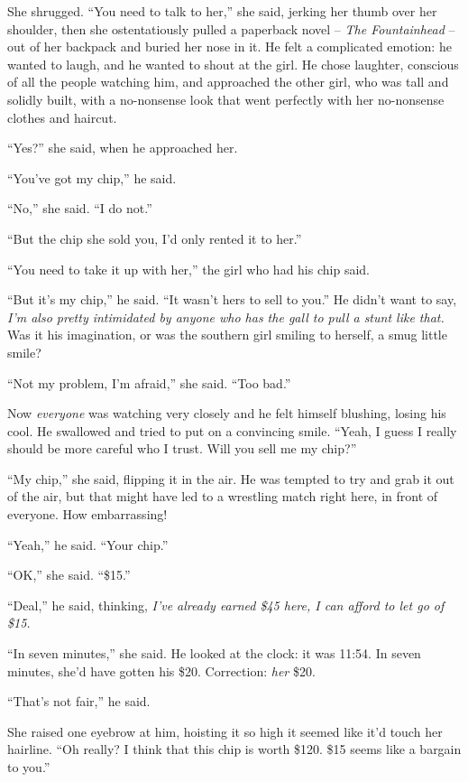 She shrugged. ``You need to talk to her,'' she said, jerking her
thumb over her shoulder, then she ostentatiously pulled a paperback
novel -- \emph{The Fountainhead} -- out of her backpack and buried
her nose in it. He felt a complicated emotion: he wanted to laugh,
and he wanted to shout at the girl. He chose laughter, conscious of
all the people watching him, and approached the other girl, who was
tall and solidly built, with a no-nonsense look that went perfectly
with her no-nonsense clothes and haircut.

``Yes?'' she said, when he approached her.

``You've got my chip,'' he said.

``No,'' she said. ``I do not.''

``But the chip she sold you, I'd only rented it to her.''

``You need to take it up with her,'' the girl who had his chip said.

``But it's my chip,'' he said. ``It wasn't hers to sell to you.'' He
didn't want to say,
\emph{I'm also pretty intimidated by anyone who has the gall to pull a stunt like that.}
Was it his imagination, or was the southern girl smiling to
herself, a smug little smile?

``Not my problem, I'm afraid,'' she said. ``Too bad.''

Now \emph{everyone} was watching very closely and he felt himself
blushing, losing his cool. He swallowed and tried to put on a
convincing smile. ``Yeah, I guess I really should be more careful
who I trust. Will you sell me my chip?''

``My chip,'' she said, flipping it in the air. He was tempted to try
and grab it out of the air, but that might have led to a wrestling
match right here, in front of everyone. How embarrassing!

``Yeah,'' he said. ``Your chip.''

``OK,'' she said. ``\$15.''

``Deal,'' he said, thinking,
\emph{I've already earned \$45 here, I can afford to let go of \$15.}

``In seven minutes,'' she said. He looked at the clock: it was 11:54.
In seven minutes, she'd have gotten his \$20. Correction:
\emph{her} \$20.

``That's not fair,'' he said.

She raised one eyebrow at him, hoisting it so high it seemed like
it'd touch her hairline. ``Oh really? I think that this chip is
worth \$120. \$15 seems like a bargain to you.''

